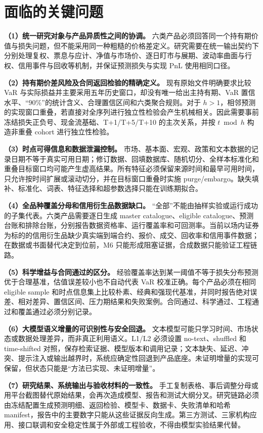 \section{面临的关键问题}

\textbf{（1）统一研究对象与产品异质性之间的协调。}
六类产品必须回答同一个持有期价值与损失问题，但不能采用同一种粗糙的价格差定义。研究需要在统一输出契约下分别处理复权、票息与应计、净值与市场价、逐日盯市与展期、波动率曲面与行权、信用事件与回收等机制，并保证预测损失与实现 PnL 使用相同口径。

\textbf{（2）持有期价差风险及合同返回检验的精确定义。}
现有原始文件明确要求比较 VaR 与实际损益并主要采用五年历史窗口，却没有唯一给出主持有期、VaR 置信水平、“\(90\%\)”的统计含义、合理置信区间和六类聚合规则。对于 \(h>1\)，相邻预测的实现窗口重叠，若直接对全序列进行独立性检验会产生机械相关。因此需要事前冻结损失正负号、现金流基础、T+1/T+5/T+10 的主次关系，并按 \(t\bmod h\) 构造非重叠 cohort 进行独立性检验。

\textbf{（3）时点可得信息和数据泄漏控制。}
市场、基本面、宏观、政策和文本数据的记录日期不等于真实可用日期；修订数据、回填数据库、随机切分、全样本标准化和重叠目标窗口均可能产生虚高结果。所有特征必须保留来源时间和最早可用时间，只允许按时间扩展或滚动切分，并在目标窗口重叠时实施 purge/embargo。缺失填补、标准化、词表、特征选择和超参数选择只能在训练期拟合。

\textbf{（4）全品种覆盖分母和信用衍生品数据缺口。}
“全部”不能由抽样实验或运行成功的子集代表。六类产品需要逐日生成 master catalogue、eligible catalogue、预测台账和排除台账，分别报告数据资格率、运行覆盖率和可回测率。当前以场内证券为标的的信用衍生品缺少真实端到端合约、报价、成交、回收率和信用事件数据；在数据或书面替代决定到位前，M6 只能形成阻塞证据，合成数据只能验证工程链路。

\textbf{（5）科学增益与合同通过的区分。}
经验覆盖率达到某一阈值不等于损失分布预测优于合理基准，估值误差较小也不自动代表 VaR 校准正确。每个产品必须在相同 eligible sample 和时点信息集上比较朴素、经典和强现代基准，并同时报告绝对误差、相对差异、置信区间、压力期结果和失败案例。合同通过、科学通过、工程通过和覆盖通过必须分别记录。

\textbf{（6）大模型语义增量的可识别性与安全回退。}
文本模型可能只学习时间、市场状态或数据处理差异，而非真正利用语义。L1/L2 必须设置 no-text、shuffled 和 time-shifted 对照，保存检索证据、模型版本和调用记录；文本缺失、延迟、冲突、提示注入或输出越界时，系统应确定性回退到产品底座。未证明增量的实现可保留，但状态只能是“方法已实现、未证明增量”。

\textbf{（7）研究结果、系统输出与验收材料的一致性。}
手工复制表格、事后调整分母或用平台截图替代原始结果，会再次造成模型、报告和测试大纲分叉。研究链路必须由冻结配置生成预测明细、返回检验、模型卡、数据卡、失败清单和哈希 manifest，报告中的主要数字只能从这些证据反向生成。第三方测试、三家机构应用、接口联调和安全稳定性属于外部或工程验收，不得由模型实验结果代替。

